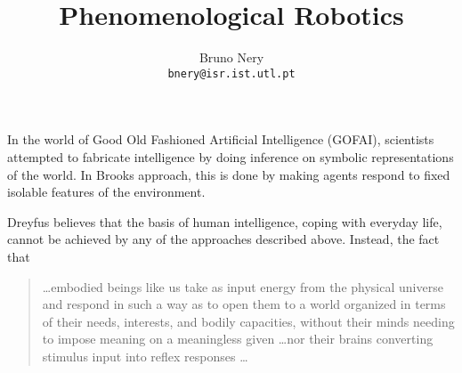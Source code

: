 \documentclass{article}
\title{Phenomenological Robotics}
\author{Bruno Nery\\
        \texttt{bnery@isr.ist.utl.pt}}
\begin{document}
\maketitle

In the world of Good Old Fashioned Artificial Intelligence (GOFAI), scientists
attempted to fabricate intelligence by doing inference on symbolic
representations of the world. In Brooks \cite{brooks91} approach, this is done
by making agents respond to fixed isolable features of the environment.

Dreyfus \cite{dreyfus07} believes that the basis of human intelligence, coping
with everyday life, cannot be achieved by any of the approaches described above.
Instead, the fact that

\begin{quotation}
\dots embodied beings like us take as input energy from the physical universe
and respond in such a way as to open them to a world organized in terms of their
needs, interests, and bodily capacities, without their minds needing to impose
meaning on a meaningless given \dots nor their brains converting stimulus input
into reflex responses \dots
\end{quotation}



\end{document}
